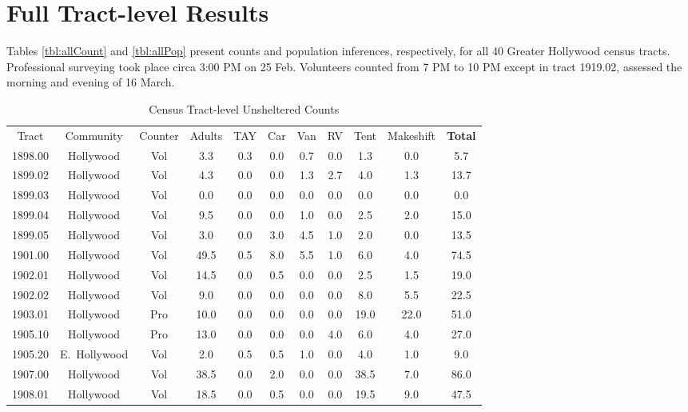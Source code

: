 \documentclass[11pt,twocolumn]{article}
\def\resp{respectively}
\begin{document}
\section{Full Tract-level Results}

Tables \ref{tbl:allCount} and \ref{tbl:allPop} present counts and population inferences, \resp, for all 40 
Greater Hollywood census tracts. Professional surveying took place circa 3:00 PM on 25 Feb. Volunteers 
counted from 7 PM to 10 PM except in tract 1919.02, assessed the morning and evening of 16 March. 

\begin{table}[t]
\caption{Census Tract-level Unsheltered Counts}
\centering
\begin{tabular}{ccccccccccc}
\toprule
Tract & Community & Counter & Adults & TAY & Car & Van & RV & Tent & Makeshift & {\bf Total} \\ \cmidrule{1-11}
1898.00 & Hollywood & Vol &  3.3 &  0.3 &  0.0 &  0.7 &  0.0 &  1.3 &  0.0 &   5.7 \\
1899.02 & Hollywood & Vol &  4.3 &  0.0 &  0.0 &  1.3 &  2.7 &  4.0 &  1.3 &  13.7 \\
1899.03 & Hollywood & Vol &  0.0 &  0.0 &  0.0 &  0.0 &  0.0 &  0.0 &  0.0 &   0.0 \\
1899.04 & Hollywood & Vol &  9.5 &  0.0 &  0.0 &  1.0 &  0.0 &  2.5 &  2.0 &  15.0 \\
1899.05 & Hollywood & Vol &  3.0 &  0.0 &  3.0 &  4.5 &  1.0 &  2.0 &  0.0 &  13.5 \\
1901.00 & Hollywood & Vol & 49.5 &  0.5 &  8.0 &  5.5 &  1.0 &  6.0 &  4.0 &  74.5 \\
1902.01 & Hollywood & Vol & 14.5 &  0.0 &  0.5 &  0.0 &  0.0 &  2.5 &  1.5 &  19.0 \\
1902.02 & Hollywood & Vol &  9.0 &  0.0 &  0.0 &  0.0 &  0.0 &  8.0 &  5.5 &  22.5 \\
1903.01 & Hollywood & Pro & 10.0 &  0.0 &  0.0 &  0.0 &  0.0 & 19.0 & 22.0 &  51.0 \\
1905.10 & Hollywood & Pro & 13.0 &  0.0 &  0.0 &  0.0 &  4.0 &  6.0 &  4.0 &  27.0 \\
1905.20 & E.~Hollywood & Vol &  2.0 &  0.5 &  0.5 &  1.0 &  0.0 &  4.0 &  1.0 &   9.0 \\
1907.00 & Hollywood & Vol & 38.5 &  0.0 &  2.0 &  0.0 &  0.0 & 38.5 &  7.0 &  86.0 \\
1908.01 & Hollywood & Vol & 18.5 &  0.0 &  0.5 &  0.0 &  0.0 & 19.5 &  9.0 &  47.5 \\

\end{tabular}
\end{table}
\end{document}
